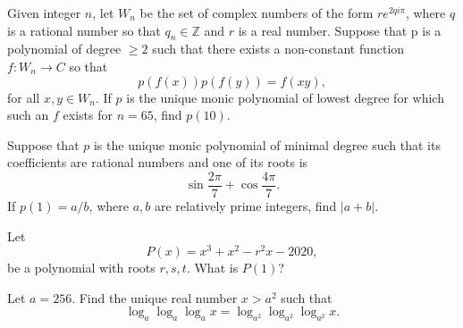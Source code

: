 \documentclass[11pt]{article}
\theoremstyle{definition}
\begin{document}
\begin{question}[name={2020 PUMaC, Algebra, \href{https://artofproblemsolving.com/community/c4p23985025}{Problem A6/B8}}]
	Given integer $n$, let $W_n$ be the set of complex numbers of the form $re^{2qi\pi}$, where $q$ is a rational number so that $q_n \in \mathbb Z$ and $r$ is a real number. Suppose that p is a polynomial of degree $ \ge 2$ such that there exists a non-constant function $f : W_n \to C$ so that $$p(f(x))p(f(y)) = f(xy),$$ for all $x, y \in W_n$. If $p$ is the unique monic polynomial of lowest degree for which such an $f$ exists for $n = 65$, find $p(10)$.
\end{question}


%	






\begin{question}[name={2020 PUMaC, Algebra, \href{https://artofproblemsolving.com/community/c4p23985027}{Problem A7}}]
	Suppose that $p$ is the unique monic polynomial of minimal degree such that its coefficients are rational numbers and one of its roots is $$\sin \frac{2\pi}{7} + \cos \frac{4\pi}{7}.$$ If $p(1) = {a}/{b}$, where $a, b$ are relatively prime integers, find $|a + b|$.
\end{question}


%	





\begin{question}[name={2020 HMMT, Algebra \& Number Theory, \href{https://artofproblemsolving.com/community/c4p14065028}{Problem 1}}]
	Let $$P(x)=x^3+x^2-r^2x-2020,$$ be a polynomial with roots $r,s,t$. What is $P(1)$?
\end{question}



%	






\begin{question}[name={2020 HMMT, Algebra \& Number Theory, \href{https://artofproblemsolving.com/community/c4p14065039}{Problem 3}}]
	Let $a=256$. Find the unique real number $x>a^2$ such that
	\[\log_a \log_a \log_a x = \log_{a^2} \log_{a^2} \log_{a^2} x.\]
\end{question}
\end{document}
